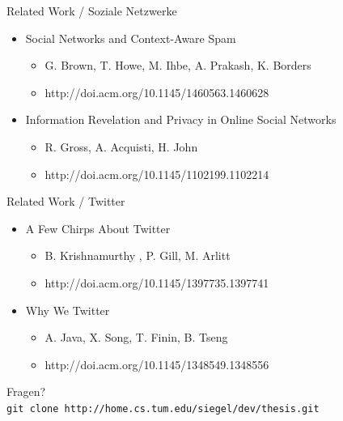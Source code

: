 \documentclass[11pt]{beamer}
\begin{document}
\begin{frame}{Related Work / Soziale Netzwerke}
  \begin{itemize}
    \item Social Networks and Context-Aware Spam
    \begin{itemize}
      \item  G. Brown, T. Howe, M. Ihbe, A. Prakash, K. Borders
      \item http://doi.acm.org/10.1145/1460563.1460628
    \end{itemize}
    \item Information Revelation and Privacy in Online Social Networks
    \begin{itemize}
      \item R. Gross, A. Acquisti, H.  John
      \item http://doi.acm.org/10.1145/1102199.1102214
    \end{itemize}
  \end{itemize}
\end{frame}

\begin{frame}{Related Work / Twitter}
  \begin{itemize}
    \item A Few Chirps About Twitter
    \begin{itemize}
      \item B. Krishnamurthy , P. Gill, M. Arlitt
      \item http://doi.acm.org/10.1145/1397735.1397741
    \end{itemize}
    \item Why We Twitter
    \begin{itemize}
      \item A. Java, X. Song, T. Finin, B. Tseng
      \item http://doi.acm.org/10.1145/1348549.1348556
    \end{itemize}
  \end{itemize}
\end{frame}

\begin{frame}
  \begin{center}
  {\Huge Fragen?}\\

\vfill
  \texttt{git clone http://home.cs.tum.edu/siegel/dev/thesis.git}
  \end{center}
\end{frame}
\end{document}
